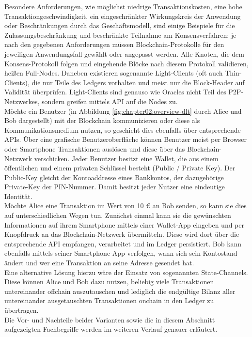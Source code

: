 Besondere Anforderungen, wie möglichst niedrige Transaktionskosten, eine hohe Transaktiongeschwindigkeit, ein eingeschränkter Wirkungskreis der Anwendung oder Beschränkungen durch das Geschäftsmodell, sind einige Beispiele für die Zulassungsbeschränkung und beschränkte Teilnahme am Konsensverfahren; je nach den gegebenen Anforderungen müssen Blockchain-Protokolle für den jeweiligen Anwendungsfall gewählt oder angepasst werden. Alle Knoten, die dem Konsens-Protokoll folgen und eingehende Blöcke nach diesem Protokoll validieren, heißen Full-Nodes. Daneben existieren sogenannte Light-Clients (oft auch Thin-Clients), die nur Teile des Ledgers vorhalten und meist nur die Block-Header auf Validität überprüfen. Light-Clients sind genauso wie Oracles nicht Teil des \ac{P2P}-Netzwerkes, sondern greifen mittels \ac{API} auf die Nodes zu.\\
Möchte ein Benutzer (in Abbildung \ref{fig:chapter02:overview-dlt} durch Alice und Bob dargestellt) mit der Blockchain kommunizieren oder diese als Kommunikationsmedium nutzen, so geschieht dies ebenfalls über entsprechende \acp{API}. Über eine grafische Benutzeroberfläche können Benutzer meist per Browser oder Smartphone Transaktionen auslösen und diese über das Blockchain-Netzwerk verschicken. Jeder Benutzer besitzt eine Wallet, die aus einem öffentlichen und einem privaten Schlüssel besteht (Public / Private Key). Der Public-Key gleicht der Kontoaddresse eines Bankkontos, der dazugehörige Private-Key der PIN-Nummer. Damit besitzt jeder Nutzer eine eindeutige Identität.\\
Möchte Alice eine Transaktion im Wert von 10 € an Bob senden, so kann sie dies auf unterschiedlichen Wegen tun. Zunächst einmal kann sie die gewünschten Informationen auf ihrem Smartphone mittels einer Wallet-App eingeben und per Knopfdruck an das Blockchain-Netzwerk übermitteln. Diese wird dort über die entsprechende \ac{API} empfangen, verarbeitet und im Ledger persistiert. Bob kann ebenfalls mittels seiner Smartphone-App verfolgen, wann sich sein Kontostand ändert und wer eine Transaktion an seine Adresse gesendet hat.\\
Eine alternative Lösung hierzu wäre der Einsatz von sogenannten State-Channels. Diese können Alice und Bob dazu nutzen, beliebig viele Transaktionen untereinander offchain auszutauschen und lediglich die endgültige Bilanz aller untereinander ausgetauschten Transaktionen onchain in den Ledger zu übertragen.\\
Die Vor- und Nachteile beider Varianten sowie die in diesem Abschnitt aufgezeigten Fachbegriffe werden im weiteren Verlauf genauer erläutert.



